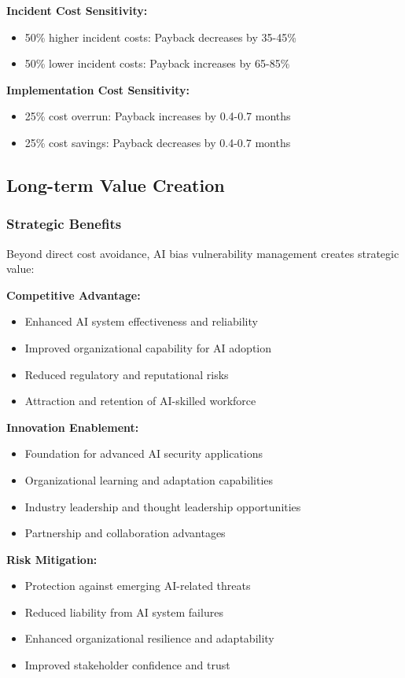 \documentclass[11pt,a4paper]{article}
\begin{document}
\textbf{Incident Cost Sensitivity:}
\begin{itemize}
\item 50\% higher incident costs: Payback decreases by 35-45\%
\item 50\% lower incident costs: Payback increases by 65-85\%
\end{itemize}

\textbf{Implementation Cost Sensitivity:}
\begin{itemize}
\item 25\% cost overrun: Payback increases by 0.4-0.7 months
\item 25\% cost savings: Payback decreases by 0.4-0.7 months
\end{itemize}

\subsection{Long-term Value Creation}

\subsubsection{Strategic Benefits}

Beyond direct cost avoidance, AI bias vulnerability management creates strategic value:

\textbf{Competitive Advantage:}
\begin{itemize}
\item Enhanced AI system effectiveness and reliability
\item Improved organizational capability for AI adoption
\item Reduced regulatory and reputational risks
\item Attraction and retention of AI-skilled workforce
\end{itemize}

\textbf{Innovation Enablement:}
\begin{itemize}
\item Foundation for advanced AI security applications
\item Organizational learning and adaptation capabilities
\item Industry leadership and thought leadership opportunities
\item Partnership and collaboration advantages
\end{itemize}

\textbf{Risk Mitigation:}
\begin{itemize}
\item Protection against emerging AI-related threats
\item Reduced liability from AI system failures
\item Enhanced organizational resilience and adaptability
\item Improved stakeholder confidence and trust
\end{itemize}
\end{document}
